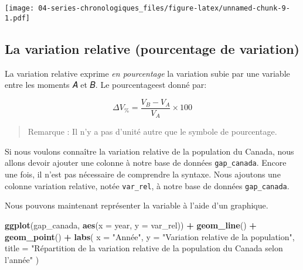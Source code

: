 \documentclass[]{book}
\newenvironment{Shaded}{\begin{snugshade}}{\end{snugshade}}
\newcommand{\KeywordTok}[1]{\textcolor[rgb]{0.13,0.29,0.53}{\textbf{#1}}}
\newcommand{\DataTypeTok}[1]{\textcolor[rgb]{0.13,0.29,0.53}{#1}}
\newcommand{\DecValTok}[1]{\textcolor[rgb]{0.00,0.00,0.81}{#1}}
\newcommand{\StringTok}[1]{\textcolor[rgb]{0.31,0.60,0.02}{#1}}
\newcommand{\OperatorTok}[1]{\textcolor[rgb]{0.81,0.36,0.00}{\textbf{#1}}}
\newcommand{\NormalTok}[1]{#1}
\begin{document}
\texttt{[image: 04-series-chronologiques\_files/figure-latex/unnamed-chunk-9-1.pdf]}

\subsection{La variation relative (pourcentage de
variation)}\label{la-variation-relative-pourcentage-de-variation}

La variation relative exprime \emph{en pourcentage} la variation subie
par une variable entre les moments 𝐴 et 𝐵. Le pourcentageest donné par:

\begin{equation}
\Delta V_{\%} = \dfrac{V_B - V_A}{V_A}\times 100
\end{equation}

\begin{quote}
Remarque : Il n'y a pas d'unité autre que le symbole de pourcentage.
\end{quote}

Si nous voulons connaître la variation relative de la population du
Canada, nous allons devoir ajouter une colonne à notre base de données
\texttt{gap\_canada}. Encore une fois, il n'est pas nécessaire de
comprendre la syntaxe. Nous ajoutons une colonne variation relative,
notée \texttt{var\_rel}, à notre base de données \texttt{gap\_canada}.

\begin{Shaded}
\end{Shaded}

Nous pouvons maintenant représenter la variable à l'aide d'un graphique.

\begin{Shaded}
\begin{Highlighting}[]
\KeywordTok{ggplot}\NormalTok{(gap_canada, }\KeywordTok{aes}\NormalTok{(}\DataTypeTok{x =}\NormalTok{ year, }\DataTypeTok{y =}\NormalTok{ var_rel)) }\OperatorTok{+}
\StringTok{  }\KeywordTok{geom_line}\NormalTok{() }\OperatorTok{+}
\StringTok{  }\KeywordTok{geom_point}\NormalTok{() }\OperatorTok{+}
\StringTok{  }\KeywordTok{labs}\NormalTok{(}
    \DataTypeTok{x =} \StringTok{"Année"}\NormalTok{,}
    \DataTypeTok{y =} \StringTok{"Variation relative de la population"}\NormalTok{,}
    \DataTypeTok{title =} \StringTok{"Répartition de la variation relative de la population du Canada selon l'année"}
\NormalTok{  )}
\end{Highlighting}
\end{Shaded}
\end{document}

